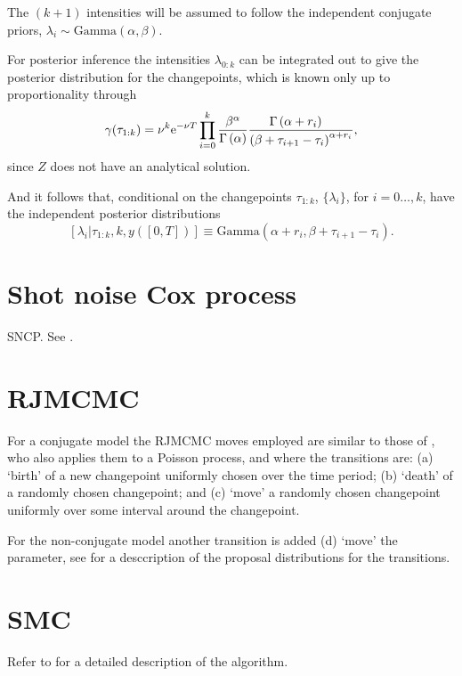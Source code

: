\documentclass{article}
\begin{document}
The $(k+1)$ intensities will be assumed to follow the independent conjugate priors, $\lambda_{i}\sim\mbox{Gamma}(\alpha, \beta)$.

For posterior inference the intensities $\lambda_{0:k}$ can be integrated out to give the posterior distribution for the changepoints, which is known only up to proportionality through
\begin{equation}
\gamma(\tau_{1:k})= \nu^{k}\mbox{e}^{-\nu T}\prod_{i=0}^{k}\frac{\beta^\alpha}{\Gamma\left(\alpha\right)}\frac{\Gamma\left(\alpha+r_{ i}\right)\hspace{2ex}}{\left(\beta+\tau_{i+1}-\tau_{i}\right)^{\alpha+r_{i}}},\label{eq:dist.gamma}
\end{equation}
since $Z$ does not have an analytical solution.

And it follows that, conditional on the changepoints $\tau_{1:k}$, $\{\lambda_i\}$, for $i=0\ldots,k$, have the independent posterior distributions
\begin{equation}
\left[\lambda_i | \tau_{1:k},k,y([0,T])\right] \equiv \mbox{Gamma}\left(\alpha+r_i,\beta+\tau_{i+1}-\tau_i\right).
\label{eq:posteriorlambda}
\end{equation}


\section{Shot noise Cox process}\label{sec:sncp}
SNCP. See \cite{turcotte15}.




\section{RJMCMC}
For a conjugate model the RJMCMC moves employed are similar to those of \cite{green05}, who also applies them to a Poisson process, and \cite{denison02} where the transitions are: (a) `birth' of a new changepoint uniformly chosen over the time period; (b) `death' of a randomly chosen changepoint; and (c) `move' a  randomly chosen changepoint uniformly over some interval around the changepoint. 

For the non-conjugate model another transition is added (d) `move' the parameter, see \cite{turcotte15} for a desccription of the proposal distributions for the transitions.



\section{SMC}
Refer to \cite{turcotte15} for a detailed description of the algorithm.






 
\end{document}
